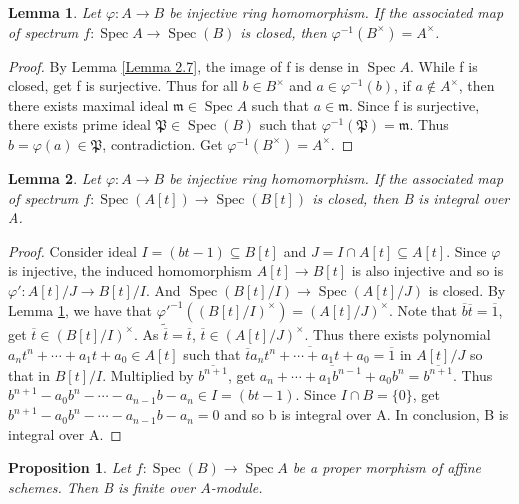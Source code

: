 \documentclass{ctexart}
\newtheorem{proposition}{Proposition}[section]
\newtheorem{lemma}{Lemma}[section]
\newcommand{\spec}{\operatorname{Spec}}
\begin{document}
\begin{lemma}
    Let $\varphi: A \longrightarrow B$ be injective ring homomorphism.
    If the associated map of spectrum $f: \spec A \longrightarrow \spec(B)$ is closed, then $\varphi^{-1}(B^{\times}) = A^{\times}$.
    \label{Lemma 4.1}
\end{lemma}
\begin{proof}
    By Lemma \ref{Lemma 2.7}, the image of f is dense in $\spec A$.
    While f is closed, get f is surjective.
    Thus for all $b\in B^{\times}$ and $a\in \varphi^{-1}(b)$, if $a\notin A^{\times}$, 
    then there exists maximal ideal $\mathfrak{m}\in \spec A$ such that $a\in \mathfrak{m}$.
    Since f is surjective, there exists prime ideal $\mathfrak{P}\in \spec(B)$ such that $\varphi^{-1}(\mathfrak{P}) = \mathfrak{m}$.
    Thus $b = \varphi(a) \in \mathfrak{P}$, contradiction.
    Get $\varphi^{-1}(B^{\times}) = A^{\times}$.
\end{proof}
\begin{lemma}
    Let $\varphi: A \longrightarrow B$ be injective ring homomorphism.
    If the associated map of spectrum $f: \spec(A[t]) \longrightarrow \spec(B[t])$ is closed, then B is integral over A.
    \label{Lemma 4.2}
\end{lemma}
\begin{proof}
    Consider ideal $I = (bt - 1) \subseteq B[t]$ and $J = I \cap A[t] \subseteq A[t]$.
    Since $\varphi$ is injective, the induced homomorphism $A[t] \longrightarrow B[t]$ is also injective and so is $\varphi': A[t]/J \longrightarrow B[t]/I$.
    And $\spec(B[t]/I)  \longrightarrow \spec(A[t]/J)$ is closed.
    By Lemma \ref{Lemma 4.1}, we have that ${\varphi'}^{-1}((B[t]/I)^{\times}) = (A[t]/J)^{\times}$.
    Note that $\overline{b}\overline{t} = \overline{1}$, get $\overline{t}\in (B[t]/I)^{\times}$.
    As $\widetilde{\overline{t}} = \overline{t}$, $\overline{t}\in (A[t]/J)^{\times}$.
    Thus there exists polynomial $a_{n}t^{n} + \cdots + a_{1}t + a_{0}\in A[t]$ such that $\overline{t}\overline{a_{n}t^{n} + \cdots + a_{1}t + a_{0}} = \overline{1}$ in $A[t]/J$ so that in $B[t]/I$.
    Multiplied by $\overline{b^{n + 1}}$, get $\overline{a_{n} + \cdots + a_{1}b^{n - 1} + a_{0}b^{n}} = \overline{b^{n + 1}}$.
    Thus $b^{n + 1} - a_{0}b^{n} - \cdots - a_{n - 1}b - a_{n}\in I = (bt - 1)$.
    Since $I \cap B = \{0\}$, get $b^{n + 1} - a_{0}b^{n} - \cdots - a_{n - 1}b - a_{n} = 0$ and so b is integral over A.
    In conclusion, B is integral over A.
\end{proof}
\begin{proposition}
    Let $f: \spec(B) \longrightarrow \spec A$ be a proper morphism of affine schemes.
    Then B is finite over $A$-module.
\end{proposition}
\end{document}
